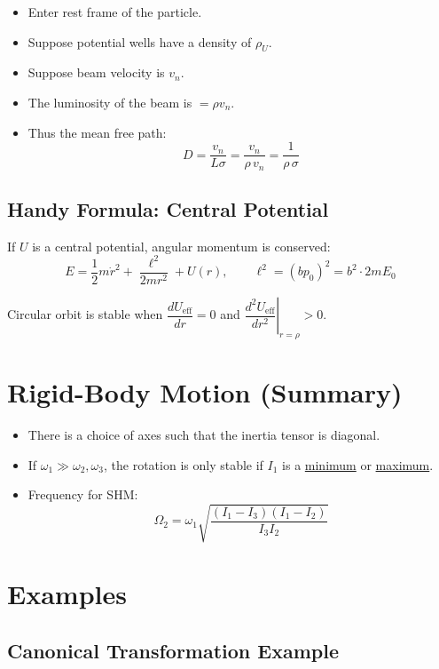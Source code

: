 \begin{itemize}
    \item Enter rest frame of the particle.
    \item Suppose potential wells have a density of $\rho_U$.
    \item Suppose beam velocity is $v_n$.
    \item The luminosity of the beam is $= \rho v_n$.
    \item Thus the mean free path:
    \[
        D = \frac{v_n}{L\sigma} = \frac{v_n}{\rho\,v_n} = \frac{1}{\rho\,\sigma}
    \]
\end{itemize}

\subsection{Handy Formula: Central Potential}

If $U$ is a central potential, angular momentum is conserved:
\[
    E = \frac{1}{2}m\dot{r}^2 + \frac{\ell^2}{2mr^2} + U(r),\qquad
    \ell^2 = (bp_0)^2 = b^2\cdot 2mE_0
\]

Circular orbit is stable when $\dfrac{dU_{\text{eff}}}{dr} = 0$ and $\left.\dfrac{d^2U_{\text{eff}}}{dr^2}\right|_{r=\rho} > 0$.

\section{Rigid-Body Motion (Summary)}

\begin{itemize}
    \item There is a choice of axes such that the inertia tensor is diagonal.
    \item If $\omega_1 \gg \omega_2, \omega_3$, the rotation is only stable if $I_1$ is a \underline{minimum} or \underline{maximum}.
    \item Frequency for SHM:
    \[
        \Omega_2 = \omega_1\sqrt{\frac{(I_1-I_3)(I_1-I_2)}{I_3 I_2}}
    \]
\end{itemize}

\section{Examples}

\subsection{Canonical Transformation Example}

